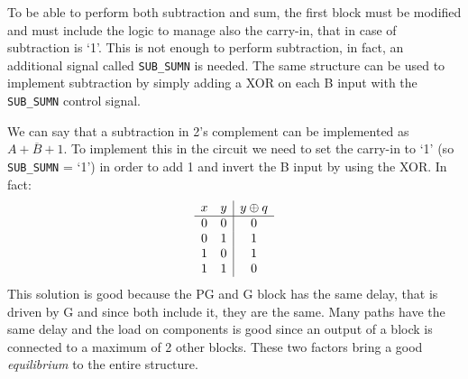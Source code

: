 To be able to perform both subtraction and sum, the first block must be modified and must include the logic to manage also the carry-in, that in case of subtraction is `1'. This is not enough to perform subtraction, in fact, an additional signal called \texttt{SUB\_SUMN} is needed.
The same structure can be used to implement subtraction by simply adding a XOR on each B input with the \texttt{SUB\_SUMN} control signal.

We can say that a subtraction in 2's complement can be implemented as $A + \overline{B} + 1$. To implement this in the circuit we need to set the carry-in to `1' (so \texttt{SUB\_SUMN} = `1') in order to add 1 and invert the B input by using the XOR. In fact:
\begin{displaymath}
    \begin{array}{c c|c}
        x & y & y \oplus q\\ %
        \hline %
        0 & 0 & 0\\
        0 & 1 & 1\\
        1 & 0 & 1\\
        1 & 1 & 0\\
    \end{array}
\end{displaymath}
This solution is good because the PG and G block has the same delay, that is driven by G and since both include it, they are the same. Many paths have the same delay and the load on components is good since an output of a block is connected to a maximum of 2 other blocks. These two factors bring a good \textit{equilibrium} to the entire structure.
